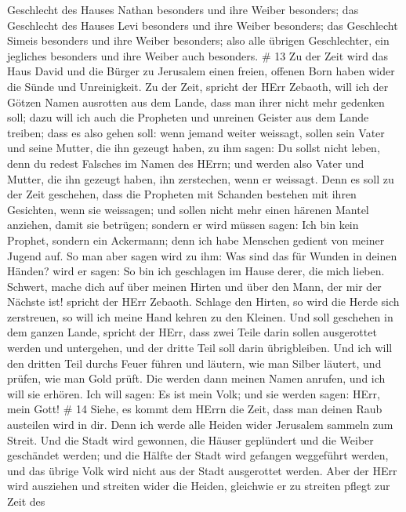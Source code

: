 Geschlecht des Hauses Nathan besonders und ihre Weiber besonders;
 das Geschlecht des Hauses Levi besonders und ihre Weiber
besonders; das Geschlecht Simeis besonders und ihre Weiber besonders;
 also alle übrigen Geschlechter, ein jegliches besonders
und ihre Weiber auch besonders. \# 13  Zu der Zeit wird das
Haus David und die Bürger zu Jerusalem einen freien, offenen Born haben
wider die Sünde und Unreinigkeit.  Zu der Zeit, spricht der
HErr Zebaoth, will ich der Götzen Namen ausrotten aus dem Lande, dass
man ihrer nicht mehr gedenken soll; dazu will ich auch die Propheten und
unreinen Geister aus dem Lande treiben;  dass es also gehen
soll: wenn jemand weiter weissagt, sollen sein Vater und seine Mutter,
die ihn gezeugt haben, zu ihm sagen: Du sollst nicht leben, denn du
redest Falsches im Namen des HErrn; und werden also Vater und Mutter,
die ihn gezeugt haben, ihn zerstechen, wenn er weissagt. 
Denn es soll zu der Zeit geschehen, dass die Propheten mit Schanden
bestehen mit ihren Gesichten, wenn sie weissagen; und sollen nicht mehr
einen härenen Mantel anziehen, damit sie betrügen;  sondern
er wird müssen sagen: Ich bin kein Prophet, sondern ein Ackermann; denn
ich habe Menschen gedient von meiner Jugend auf.  So man
aber sagen wird zu ihm: Was sind das für Wunden in deinen Händen? wird
er sagen: So bin ich geschlagen im Hause derer, die mich lieben.
 Schwert, mache dich auf über meinen Hirten und über den
Mann, der mir der Nächste ist! spricht der HErr Zebaoth. Schlage den
Hirten, so wird die Herde sich zerstreuen, so will ich meine Hand kehren
zu den Kleinen.  Und soll geschehen in dem ganzen Lande,
spricht der HErr, dass zwei Teile darin sollen ausgerottet werden und
untergehen, und der dritte Teil soll darin übrigbleiben. 
Und ich will den dritten Teil durchs Feuer führen und läutern, wie man
Silber läutert, und prüfen, wie man Gold prüft. Die werden dann meinen
Namen anrufen, und ich will sie erhören. Ich will sagen: Es ist mein
Volk; und sie werden sagen: HErr, mein Gott! \# 14  Siehe,
es kommt dem HErrn die Zeit, dass man deinen Raub austeilen wird in dir.
 Denn ich werde alle Heiden wider Jerusalem sammeln zum
Streit. Und die Stadt wird gewonnen, die Häuser geplündert und die
Weiber geschändet werden; und die Hälfte der Stadt wird gefangen
weggeführt werden, und das übrige Volk wird nicht aus der Stadt
ausgerottet werden.  Aber der HErr wird ausziehen und
streiten wider die Heiden, gleichwie er zu streiten pflegt zur Zeit des
